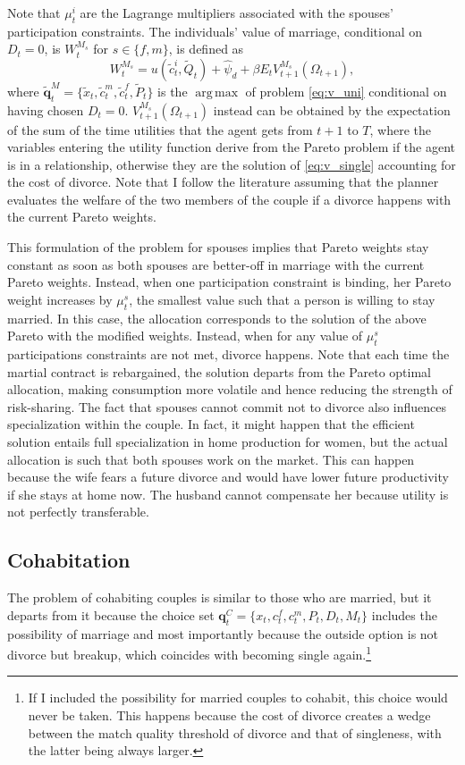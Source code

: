 \documentclass[12pt]{article}
\DeclareMathOperator*{\argmax}{arg\,max}
\begin{document}
Note that $\mu^i_t$ are the Lagrange multipliers associated with the spouses' participation constraints. The individuals' value of marriage, conditional on $D_t=0$, is  $W_{t}^{M_s}$ for $s\in\{f,m\}$, is defined as 
\begin{equation}
W_{t}^{M_s}=u(\tilde{c}_t^{i},\tilde{Q}_t)+\hat{\psi}_d+\beta E_t V_{t+1}^{M_s}(\Omega_{t+1}),
\end{equation}
where
$\mathbf{\tilde{q}}^{M}_t=\{\tilde{x}_{t},\tilde{c}^{m}_{t},\tilde{c}^{f}_{t},\tilde{P}_t\}$ is the $\argmax$ of problem \eqref{eq:v_uni} conditional on having chosen $D_t=0$. $V_{t+1}^{M_s}(\Omega_{t+1})$ instead can be obtained by the expectation of the sum of the time utilities that the agent gets from $t+1$ to $T$, where the variables entering the utility function derive from the Pareto problem if the agent is in a relationship, otherwise they are the solution of \eqref{eq:v_single} accounting for the cost of divorce. Note that I follow the literature assuming that the planner evaluates the welfare of the two members of the couple if a divorce happens with the current Pareto weights.

This formulation of the problem for spouses implies that Pareto weights stay constant as soon as both spouses are better-off in marriage with the current Pareto weights. Instead, when one participation constraint is binding, her Pareto weight increases by $\mu_t^s$, the smallest value such that a person is willing to stay married. In this case, the allocation corresponds to the solution of the above Pareto with the modified weights. Instead, when for any value of $\mu_t^s$ participations constraints are not met, divorce happens. Note that each time the martial contract is rebargained, the solution departs from the Pareto optimal allocation, making consumption more volatile and hence reducing the strength of risk-sharing. The fact that spouses cannot commit not to divorce also influences specialization within the couple. In fact, it might happen that the efficient solution entails full specialization in home production for women, but the actual allocation is such that both spouses work on the market. This can happen because the wife fears a future divorce and would have lower future productivity if she stays at home now. The husband cannot compensate her because utility is not perfectly transferable. 
\subsection{Cohabitation}
The problem of cohabiting couples is similar to those who are married, but it departs from it because the choice set $\mathbf{q}^C_t=\{x_t,c^f_t,c^m_t,P_t,D_t,M_t\}$ includes the possibility of marriage and most importantly because the outside option is not divorce but breakup, which coincides with becoming single again.\footnote{If I included the possibility for married couples to cohabit, this choice would never be taken. This happens because the cost of divorce creates a wedge between the match quality threshold of divorce and that of singleness, with the latter being always larger.}
\end{document}
